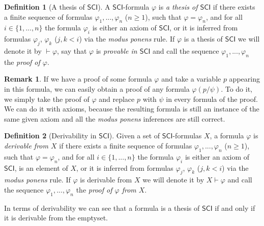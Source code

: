 \documentclass{article}
\theoremstyle{definition}
\newtheorem{definition}{Definition}[section]
\theoremstyle{definition}
\theoremstyle{definition}
\newtheorem{remark}{Remark}[section]
\newcommand{\SCI}{$\mathsf{SCI}$\xspace}
\begin{document}
\begin{definition}[A thesis of \SCI]
    A \SCI-formula $\varphi$ is \emph{a thesis of \SCI} if there exists a finite sequence of formulas $\varphi_1, ..., \varphi_n$ ($n \geq 1$), such that $\varphi = \varphi_n$, and for all $i \in \{1, ..., n\}$ the formula $\varphi_i$ is either an axiom of \SCI, or it is inferred from formulas $\varphi_j$, $\varphi_k$ ($j, k <i$) via the \emph{modus ponens} rule. If $\varphi$ is a thesis of \SCI we will denote it by $\vdash \varphi$, say that $\varphi$ is \emph{provable in \SCI} and call the sequence $\varphi_1, ..., \varphi_n$ the \emph{proof of $\varphi$}.
    \label{thesis}
\end{definition}
%
\begin{remark}
    \label{remark_proof_varphi}
    If we have a proof of some formula $\varphi$ and take a variable $p$ appearing in this formula, we can easily obtain a proof of any formula $\varphi(p/\psi)$. To do it, we simply take the proof of $\varphi$ and replace $p$ with $\psi$ in every formula of the proof. We can do it with axioms, because the resulting formula is still an instance of the same given axiom and all the \emph{modus ponens} inferences are still correct.
\end{remark}
%
\begin{definition}[Derivability in \SCI]
    Given a set of \SCI-formulas $X$, a formula $\varphi$ is \emph{derivable from $X$} if there exists a finite sequence of formulas $\varphi_1, ..., \varphi_n$ ($n \geq 1$), such that $\varphi = \varphi_n$, and for all $i \in \{1, ..., n\}$ the formula $\varphi_i$ is either an axiom of \SCI, is an element of $X$, or it is inferred from formulas $\varphi_j$, $\varphi_k$ ($j, k <i$) via the \emph{modus ponens} rule. If $\varphi$ is derivable from $X$ we will denote it by $X \vdash \varphi$ and call the sequence $\varphi_1, ..., \varphi_n$ the \emph{proof of $\varphi$ from $X$}.
\end{definition}
%
In terms of derivability we can see that a formula is a thesis of \SCI if and
only if it is derivable from the emptyset.
\end{document}
